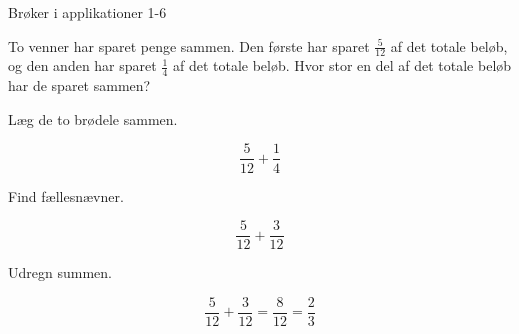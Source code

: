 \documentclass{article}
\begin{document}
\newpage

\begin{exercise}{Brøker i applikationer 1-6}

To venner har sparet penge sammen. Den første har sparet $\frac{5}{12}$ af det totale beløb, og den anden har sparet $\frac{1}{4}$ af det totale beløb. Hvor stor en del af det totale beløb har de sparet sammen?


\hint

Læg de to brødele sammen.

\hint
\[
\frac{5}{12} + \frac{1}{4}
\]

\hint

Find fællesnævner.

\hint
\[
\frac{5}{12} + \frac{3}{12}
\]

\hint

Udregn summen.

\hint
\[
\frac{5}{12} + \frac{3}{12} = \frac{8}{12} = \frac{2}{3}
\]

\end{exercise}
\end{document}
